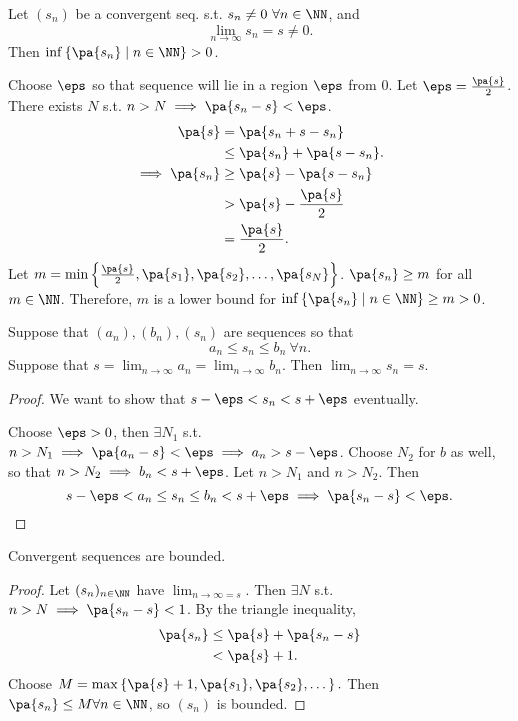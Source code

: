 \documentclass[11pt]{scrartcl}
\numberwithin{equation}{section}
\begin{document}
\begin{example}
    Let $(s_n)$ be a convergent seq. s.t. $s_n\neq 0 \ \forall n \in \NN$,
    and 
    \[ \lim_{n\rightarrow \infty}s_n = s \neq 0.\] 
    Then $\inf \left\{\pa{s_n}\mid n \in \NN\right\}>0$.

    Choose $\eps$ so that sequence will lie in a region $\eps$ from 
    $0$. Let $\eps = \frac{\pa{s}}{2}$. 
    There exists $N$ s.t. 
    $n>N \implies \pa{s_n-s}<\eps$.
    \begin{align*}
        \pa{s} &= \pa{s_n+s-s_n} \\
        &\leq \pa{s_n} + \pa{s-s_n}.\\
        \implies \pa{s_n} &\geq \pa{s}-\pa{s-s_n} \\
        &> \pa{s}-\frac{\pa{s}}{2}\\ 
        &= \frac{\pa{s}}{2}.
    \end{align*}
    Let $m =\min \left\{\frac{\pa{s}}{2}, \pa{s_1},\pa{s_2},\dots, \pa{s_N}\right\}$. $\pa{s_n} \geq m$ for all $m\in \NN$.
    Therefore, $m$ is a lower bound for $\inf\left\{\pa{s_n}\mid n \in \NN\right\}\geq m > 0$.
\end{example}
\begin{theorem}
    \label{thm:sandle}
    Suppose that $(a_n),(b_n),(s_n)$ are sequences so that 
    \[ a_n\leq s_n \leq b_n \ \forall n. \]
    Suppose that $s=\lim_{n\rightarrow \infty} a_n = \lim_{n\rightarrow \infty} b_n.$ Then $\lim_{n\rightarrow \infty} s_n =s$. 
\end{theorem}
\begin{proof}
    We want to show that $s-\eps<s_n<s+\eps$ eventually.
    
    Choose $\eps>0$, then $\exists N_1$ s.t. 
    $n>N_1 \implies \pa{a_n-s}<\eps \implies a_n>s-\eps$.
    Choose $N_2$ for $b$ as well, so that
    $n>N_2\implies b_n<s+\eps$. Let $n>N_1$ and $n > N_2$. Then 
    \[ s-\eps < a_n \leq s_n \leq b_n < s+ \eps 
    \implies \pa{s_n-s} < \eps. \qedhere \]
\end{proof}
\begin{proposition}
    Convergent sequences are bounded.
\end{proposition}
\begin{proof}
    Let $(s_n)_{n\in\NN}$ have $\lim_{n\rightarrow\infty =s}$.
    Then $\exists N$ s.t. $n>N\implies \pa{s_n-s}<1$.
    By the triangle inequality,
    \begin{align*}
        \pa{s_n} &\leq \pa{s}+\pa{s_n-s} \\
        &<\pa{s}+1.
    \end{align*}
    Choose $M = \max \left\{\pa{s}+1, \pa{s_1},\pa{s_2},\dots\right\}.$
    Then $\pa{s_n}\leq M\forall n \in \NN$, so $(s_n)$ is bounded.
\end{proof}
\end{document}
